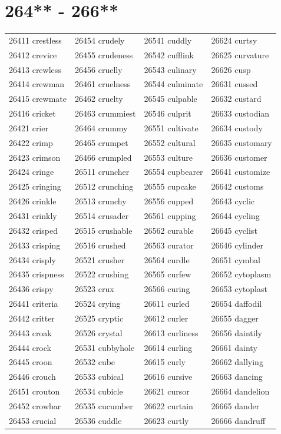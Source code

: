 \documentclass[10pt, oneside]{book}
\begin{document}
\begin{table}
	\centering
	\section*{264** - 266**}
	\begin{tabular}{l l l l}
26411 crestless &26454 crudely &26541 cuddly &26624 curtsy\\
26412 crevice &26455 crudeness &26542 cufflink &26625 curvature\\
26413 crewless &26456 cruelly &26543 culinary &26626 cusp\\
26414 crewman &26461 cruelness &26544 culminate &26631 cussed\\
26415 crewmate &26462 cruelty &26545 culpable &26632 custard\\
26416 cricket &26463 crummiest &26546 culprit &26633 custodian\\
26421 crier &26464 crummy &26551 cultivate &26634 custody\\
26422 crimp &26465 crumpet &26552 cultural &26635 customary\\
26423 crimson &26466 crumpled &26553 culture &26636 customer\\
26424 cringe &26511 cruncher &26554 cupbearer &26641 customize\\
26425 cringing &26512 crunching &26555 cupcake &26642 customs\\
26426 crinkle &26513 crunchy &26556 cupped &26643 cyclic\\
26431 crinkly &26514 crusader &26561 cupping &26644 cycling\\
26432 crisped &26515 crushable &26562 curable &26645 cyclist\\
26433 crisping &26516 crushed &26563 curator &26646 cylinder\\
26434 crisply &26521 crusher &26564 curdle &26651 cymbal\\
26435 crispness &26522 crushing &26565 curfew &26652 cytoplasm\\
26436 crispy &26523 crux &26566 curing &26653 cytoplast\\
26441 criteria &26524 crying &26611 curled &26654 daffodil\\
26442 critter &26525 cryptic &26612 curler &26655 dagger\\
26443 croak &26526 crystal &26613 curliness &26656 daintily\\
26444 crock &26531 cubbyhole &26614 curling &26661 dainty\\
26445 croon &26532 cube &26615 curly &26662 dallying\\
26446 crouch &26533 cubical &26616 cursive &26663 dancing\\
26451 crouton &26534 cubicle &26621 cursor &26664 dandelion\\
26452 crowbar &26535 cucumber &26622 curtain &26665 dander\\
26453 crucial &26536 cuddle &26623 curtly &26666 dandruff\\
	\end{tabular}
 \end{table}
\clearpage
\end{document}
